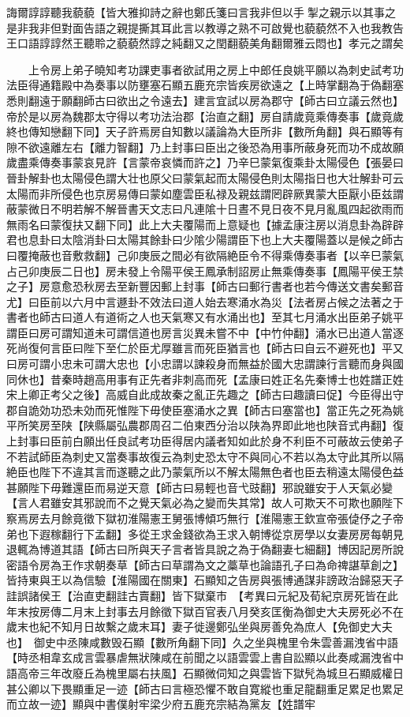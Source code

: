 誨爾諄諄聽我藐藐【皆大雅抑詩之辭也鄭氏箋曰言我非但以手掣之親示以其事之是非我非但對面告語之親提撕其耳此言以教導之熟不可啟覺也藐藐然不入也我教告王口語諄諄然王聽聆之藐藐然諄之純翻又之閏翻藐美角翻爾雅云悶也】孝元之謂矣

　　上令房上弟子曉知考功課吏事者欲試用之房上中郎任良姚平願以為刺史試考功法臣得通籍殿中為奏事以防壅塞石顯五鹿充宗皆疾房欲遠之【上時掌翻為于偽翻塞悉則翻遠于願翻師古曰欲出之令遠去】建言宜試以房為郡守【師古曰立議云然也】帝於是以房為魏郡太守得以考功法治郡【治直之翻】房自請歲竟乘傳奏事【歲竟歲終也傳知戀翻下同】天子許焉房自知數以議論為大臣所非【數所角翻】與石顯等有隙不欲遠離左右【離力智翻】乃上封事曰臣出之後恐為用事所蔽身死而功不成故願歲盡乘傳奏事蒙哀見許【言蒙帝哀憐而許之】乃辛巳蒙氣復乘卦太陽侵色【張晏曰晉卦解卦也太陽侵色謂大壮也原父曰蒙氣起而太陽侵色則太陽指日也大壮解卦可云太陽而非所侵色也京房易傳曰蒙如塵雲臣私禄及親兹謂罔辟厥異蒙大臣厭小臣兹謂蔽蒙微日不明若解不解晉書天文志曰凡連隂十日晝不見日夜不見月亂風四起欲雨而無雨名曰蒙復扶又翻下同】此上大夫覆陽而上意疑也【據孟康注房以消息卦為辟辟君也息卦曰太陰消卦曰太陽其餘卦曰少隂少陽謂臣下也上大夫覆陽蓋以是候之師古曰覆掩蔽也音敷救翻】己卯庚辰之間必有欲隔絶臣令不得乘傳奏事者【以辛巳蒙氣占己卯庚辰二日也】房未發上令陽平侯王鳳承制詔房止無乘傳奏事【鳳陽平侯王禁之子】房意愈恐秋房去至新豐因郵上封事【師古曰郵行書者也若今傳送文書矣郵音尤】曰臣前以六月中言遯卦不效法曰道人始去寒涌水為災【法者房占候之法著之于書者也師古曰道人有道術之人也天氣寒又有水涌出也】至其七月涌水出臣弟子姚平謂臣曰房可謂知道未可謂信道也房言災異未嘗不中【中竹仲翻】涌水已出道人當逐死尚復何言臣曰陛下至仁於臣尤厚雖言而死臣猶言也【師古曰自云不避死也】平又曰房可謂小忠未可謂大忠也【小忠謂以諫殺身而無益於國大忠謂諫行言聽而身與國同休也】昔秦時趙高用事有正先者非刺高而死【孟康曰姓正名先秦博士也姓譜正姓宋上卿正考父之後】高威自此成故秦之亂正先趣之【師古曰趣讀曰促】今臣得出守郡自詭効功恐未効而死惟陛下毋使臣塞涌水之異【師古曰塞當也】當正先之死為姚平所笑房至陕【陕縣屬弘農郡周召二伯東西分治以陕為界即此地也陕音式冉翻】復上封事曰臣前白願出任良試考功臣得居内議者知如此於身不利臣不可蔽故云使弟子不若試師臣為刺史又當奏事故復云為刺史恐太守不與同心不若以為太守此其所以隔絶臣也陛下不違其言而遂聽之此乃蒙氣所以不解太陽無色者也臣去稍遠太陽侵色益甚願陛下毋難還臣而易逆天意【師古曰易輕也音弋豉翻】邪說雖安于人天氣必變【言人君雖安其邪說而不之覺天氣必為之變而失其常】故人可欺天不可欺也願陛下察焉房去月餘竟徵下獄初淮陽憲王舅張博傾巧無行【淮陽憲王欽宣帝張偼伃之子帝弟也下遐稼翻行下孟翻】多從王求金錢欲為王求入朝博從京房學以女妻房房每朝見退輒為博道其語【師古曰所與天子言者皆具說之為于偽翻妻七細翻】博因記房所說密語令房為王作求朝奏草【師古曰草謂為文之藁草也論語孔子曰為命禆諶草創之】皆持東與王以為信驗【淮陽國在關東】石顯知之告房與張博通謀非謗政治歸惡天子詿誤諸侯王【治直吏翻詿古賣翻】皆下獄棄市　【考異曰元紀及荀紀京房死皆在此年末按房傳二月末上封事去月餘徵下獄百官表八月癸亥匡衡為御史大夫房死必不在歲末也紀不知月日故繫之歲末耳】妻子徙邊鄭弘坐與房善免為庶人【免御史大夫也】　御史中丞陳咸數毁石顯【數所角翻下同】久之坐與槐里令朱雲善漏洩省中語【時丞相韋玄成言雲暴虐無狀陳咸在前聞之以語雲雲上書自訟顯以此奏咸漏洩省中語高帝三年改廢丘為槐里屬右扶風】石顯微伺知之與雲皆下獄髠為城旦石顯威權日甚公卿以下畏顯重足一迹【師古曰言極恐懼不敢自寛縱也重足龍翻重足累足也累足而立故一迹】顯與中書僕射牢梁少府五鹿充宗結為黨友【姓譜牢